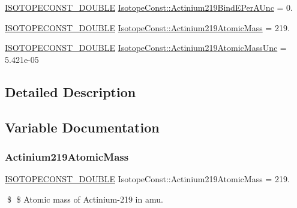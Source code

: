 \begin{DoxyCompactItemize}
\mbox{\hyperlink{group___isotope_const-_macros_ga8f45a7272ce02c0b4c65c44636ed719a}{I\+S\+O\+T\+O\+P\+E\+C\+O\+N\+S\+T\+\_\+\+D\+O\+U\+B\+LE}} \mbox{\hyperlink{group___isotope_const-_actinium-_ac219_gabf9d51a35de6efe2352e5d3a32816fb8}{Isotope\+Const\+::\+Actinium219\+Bind\+E\+Per\+A\+Unc}} = 0.
\item 
\mbox{\hyperlink{group___isotope_const-_macros_ga8f45a7272ce02c0b4c65c44636ed719a}{I\+S\+O\+T\+O\+P\+E\+C\+O\+N\+S\+T\+\_\+\+D\+O\+U\+B\+LE}} \mbox{\hyperlink{group___isotope_const-_actinium-_ac219_gab8c204c4a28b91633edabbeb2467afef}{Isotope\+Const\+::\+Actinium219\+Atomic\+Mass}} = 219.
\item 
\mbox{\hyperlink{group___isotope_const-_macros_ga8f45a7272ce02c0b4c65c44636ed719a}{I\+S\+O\+T\+O\+P\+E\+C\+O\+N\+S\+T\+\_\+\+D\+O\+U\+B\+LE}} \mbox{\hyperlink{group___isotope_const-_actinium-_ac219_ga222e204c2c64c53dba4ac1fb87827b93}{Isotope\+Const\+::\+Actinium219\+Atomic\+Mass\+Unc}} = 5.\+421e-\/05
\end{DoxyCompactItemize}


\subsection{Detailed Description}


\subsection{Variable Documentation}
\mbox{\label{group___isotope_const-_actinium-_ac219_gab8c204c4a28b91633edabbeb2467afef}} 
\subsubsection{\texorpdfstring{Actinium219\+Atomic\+Mass}{Actinium219AtomicMass}}
{\footnotesize\ttfamily \mbox{\hyperlink{group___isotope_const-_macros_ga8f45a7272ce02c0b4c65c44636ed719a}{I\+S\+O\+T\+O\+P\+E\+C\+O\+N\+S\+T\+\_\+\+D\+O\+U\+B\+LE}} Isotope\+Const\+::\+Actinium219\+Atomic\+Mass = 219.}

\$ \$ Atomic mass of Actinium-\/219 in amu. \mbox{\label{group___isotope_const-_actinium-_ac219_ga222e204c2c64c53dba4ac1fb87827b93}} 
